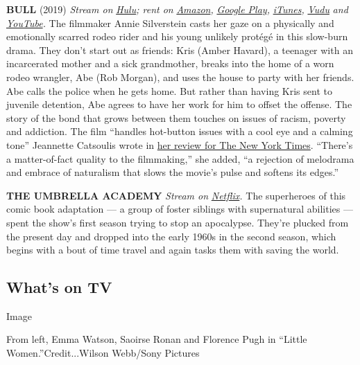 \textbf{BULL} (2019) \emph{Stream on}
\href{https://www.hulu.com/movie/bull-2a7ac784-e2ad-4503-b435-eaa42da82ab8}{\emph{Hulu}}\emph{;
rent on}
\href{https://www.amazon.com/gp/video/detail/amzn1.dv.gti.92b89e94-666b-18d4-a5b5-bcb162dc745b?autoplay=1\&ref_=atv_cf_strg_wb}{\emph{Amazon}}\emph{,}
\href{https://play.google.com/store/movies/details?id=jc9XaqdJufI.P}{\emph{Google
Play}}\emph{,}
\href{https://itunes.apple.com/us/movie/bull/id1503115157}{\emph{iTunes}}\emph{,}
\href{https://www.vudu.com/content/movies/details/Bull/1412867}{\emph{Vudu}}
\emph{and}
\href{https://www.youtube.com/watch?v=ySwIVtwVNPM}{\emph{YouTube}}\emph{.}
The filmmaker Annie Silverstein casts her gaze on a physically and
emotionally scarred rodeo rider and his young unlikely protégé in this
slow-burn drama. They don't start out as friends: Kris (Amber Havard), a
teenager with an incarcerated mother and a sick grandmother, breaks into
the home of a worn rodeo wrangler, Abe (Rob Morgan), and uses the house
to party with her friends. Abe calls the police when he gets home. But
rather than having Kris sent to juvenile detention, Abe agrees to have
her work for him to offset the offense. The story of the bond that grows
between them touches on issues of racism, poverty and addiction. The
film ``handles hot-button issues with a cool eye and a calming tone''
Jeannette Catsoulis wrote in
\href{https://www.nytimes3xbfgragh.onion/2020/04/30/movies/bull-review.html}{her
review for The New York Times}. ``There's a matter-of-fact quality to
the filmmaking,'' she added, ``a rejection of melodrama and embrace of
naturalism that slows the movie's pulse and softens its edges.''

\textbf{THE UMBRELLA ACADEMY} \emph{Stream on}
\href{https://www.netflix.com/title/80186863}{\emph{Netflix}}\emph{.}
The superheroes of this comic book adaptation --- a group of foster
siblings with supernatural abilities --- spent the show's first season
trying to stop an apocalypse. They're plucked from the present day and
dropped into the early 1960s in the second season, which begins with a
bout of time travel and again tasks them with saving the world.

\hypertarget{whats-on-tv}{%
\subsection{What's on TV}\label{whats-on-tv}}

Image

From left, Emma Watson, Saoirse Ronan and Florence Pugh in ``Little
Women.''Credit...Wilson Webb/Sony Pictures


